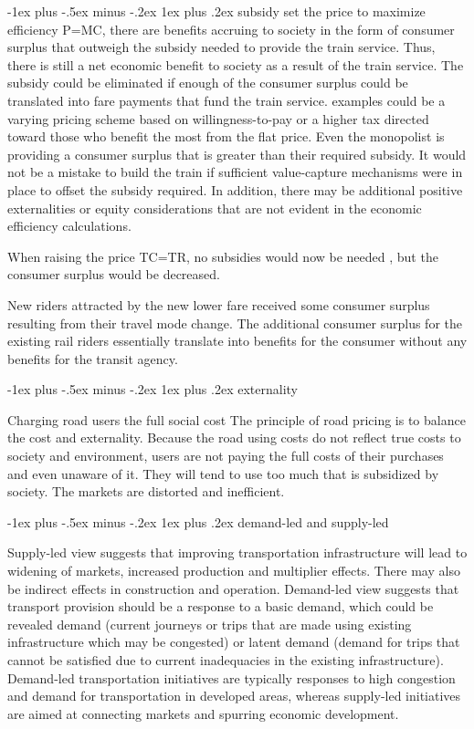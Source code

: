 \documentclass[10pt,portrait]{article}
\makeatletter
\renewcommand{\subsubsection}{\@startsection{subsubsection}{3}{0mm}%
                                {-1ex plus -.5ex minus -.2ex}%
                                {1ex plus .2ex}%
                                {\normalfont\small\bfseries}}
\makeatother
\begin{document}
\begin{multicols}{2}
\subsubsection{subsidy}
set the price to maximize efficiency P=MC, there are benefits accruing to society in the form of consumer surplus that outweigh the subsidy needed to provide the train service. Thus, there is still a net economic benefit to society as a result of the train service. The subsidy could be eliminated if enough of the consumer surplus could be translated into fare payments that fund the train service. examples could be a varying pricing scheme based on willingness-to-pay or a higher tax directed toward those who benefit the most from the flat price. Even the monopolist is providing a consumer surplus that is greater than their required subsidy. It would not be a mistake to build the train if sufficient value-capture mechanisms were in place to offset the subsidy required. In addition, there may be additional positive externalities or equity considerations that are not evident in the economic efficiency calculations.

When raising the price TC=TR, no subsidies would now be needed , but the consumer surplus would be decreased.

New riders attracted by the new lower fare received some consumer surplus resulting from their travel mode change. The additional consumer surplus for the existing rail riders essentially translate into benefits for the consumer without any benefits for the transit agency.

\subsubsection{externality}

Charging road users the full social cost
The principle of road pricing is to balance the cost and externality. Because the road using costs do not reflect true costs to society and environment, users are not paying the full costs of their purchases and even unaware of it. They will tend to use too much that is subsidized by society. The markets are distorted and inefficient.

\subsubsection{demand-led and supply-led}

Supply-led view suggests that improving transportation infrastructure will lead to widening of markets, increased production and multiplier effects. There may also be indirect effects in construction and operation. Demand-led view suggests that transport provision should be a response to a basic demand, which could be revealed demand (current journeys or trips that are made using existing infrastructure which may be congested) or latent demand (demand for trips that cannot be satisfied due to current inadequacies in the existing infrastructure). Demand-led transportation initiatives are typically responses to high congestion and demand for transportation in developed areas, whereas supply-led initiatives are aimed at connecting markets and spurring economic development.


\end{multicols}
\end{document}
